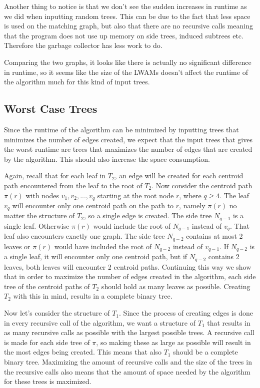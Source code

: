 Another thing to notice is that we don't see the sudden increases in runtime as we did when inputting random trees. This can be due to the fact that less space is used on the matching graph, but also that there are no recursive calls meaning that the program does not use up memory on side trees, induced subtrees etc. Therefore the garbage collector has less work to do.

Comparing the two graphs, it looks like there is actually no significant difference in runtime, so it seems like the size of the LWAMs doesn't affect the runtime of the algorithm much for this kind of input trees.

\subsection{Worst Case Trees}
Since the runtime of the algorithm can be minimized by inputting trees that minimizes the number of edges created, we expect that the input trees that gives the worst runtime are trees that maximizes the number of edges that are created by the algorithm. This should also increase the space consumption.

Again, recall that for each leaf in $T_2$, an edge will be created for each centroid path encountered from the leaf to the root of $T_2$. Now consider the centroid path $\pi(r)$ with nodes $v_1, v_2, ..., v_q$ starting at the root node $r$, where $q \ge 4$. The leaf $v_q$ will encounter only one centroid path on the path to $r$, namely $\pi(r)$ no matter the structure of $T_2$, so a single edge is created. The side tree $N_{q-1}$ is a single leaf. Otherwise $\pi(r)$ would include the root of $N_{q-1}$ instead of $v_q$. That leaf also encounters exactly one graph. The side tree $N_{q-2}$ contains at most 2 leaves or $\pi(r)$ would have included the root of $N_{q-2}$ instead of $v_{q-1}$. If $N_{q-2}$ is a single leaf, it will encounter only one centroid path, but if $N_{q-2}$ contains 2 leaves, both leaves will encounter 2 centroid paths. Continuing this way we show that in order to maximize the number of edges created in the algorithm, each side tree of the centroid paths of $T_2$ should hold as many leaves as possible. Creating $T_2$ with this in mind, results in a complete binary tree.

Now let's consider the structure of $T_1$. Since the process of creating edges is done in every recursive call of the algorithm, we want a structure of $T_1$ that results in as many recursive calls as possible with the largest possible trees. A recursive call is made for each side tree of $\pi$, so making these as large as possible will result in the most edges being created. This means that also $T_1$ should be a complete binary tree. Maximizing the amount of recursive calls and the size of the trees in the recursive calls also means that the amount of space needed by the algorithm for these trees is maximized.


